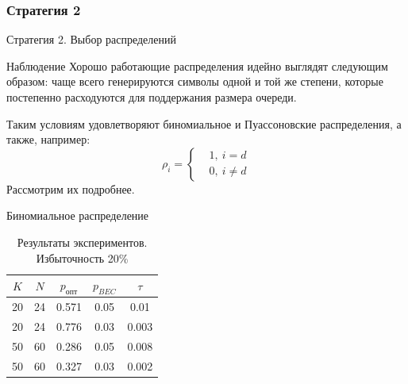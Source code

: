 \documentclass{beamer}
\begin{document}
\subsubsection{Стратегия 2}

\begin{frame}{Стратегия 2. Выбор распределений}

    \begin{block}{Наблюдение}
        Хорошо работающие распределения идейно выглядят
        следующим образом: чаще всего генерируются символы одной и
        той же степени, которые постепенно расходуются 
        для поддержания размера очереди.
    \end{block}

    Таким условиям удовлетворяют биномиальное и Пуассоновские распределения,
    а также, например:
    \[
        \rho_i=
        \left\{
        \begin{aligned}
            &1,\: i = d\\
            &0,\: i\ne d
        \end{aligned}
        \right.
    \]
    Рассмотрим их подробнее.
    
\end{frame}

\begin{frame}{Биномиальное распределение}
    

    \begin{table}[h!]
    \begin{center}
        \begin{tabular}{|c|c|c|c|c|}
            \hline
            $K$ & $N$ & $p_{\text{опт}}$ & $p_{BEC}$ & $\tau$ \\ 
            \hline
            20 & 24 & 0.571 & 0.05 & 0.01 \\
            \hline
            20 & 24 & 0.776 & 0.03 & 0.003 \\ 
            \hline 
            50 & 60 & 0.286 & 0.05 & 0.008 \\ 
            \hline
            50 & 60 & 0.327 & 0.03 & 0.002 \\
            \hline
        \end{tabular}
    \caption{Результаты экспериментов. Избыточность 20\%}
    \end{center}
    \end{table}
\end{frame}
\end{document}
